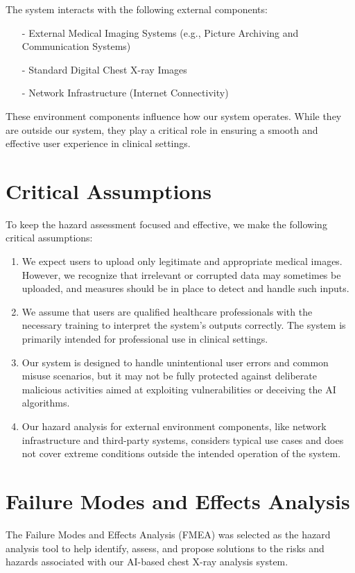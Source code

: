 \documentclass{article}
\begin{document}
The system interacts with the following external components:

\begin{itemize}
    \item[-] External Medical Imaging Systems (e.g., Picture Archiving and Communication Systems)
    \item[-] Standard Digital Chest X-ray Images
    \item[-] Network Infrastructure (Internet Connectivity)
\end{itemize}
These environment components influence how our system operates. While they are outside our system, they play a critical role in ensuring a smooth and effective user experience in clinical settings.

\section{Critical Assumptions}

To keep the hazard assessment focused and effective, we make the following critical assumptions:

\begin{enumerate}
    \item {We expect users to upload only legitimate and appropriate medical images. However, we recognize that irrelevant or corrupted data may sometimes be uploaded, and measures should be in place to detect and handle such inputs.}

    \item {We assume that users are qualified healthcare professionals with the necessary training to interpret the system's outputs correctly. The system is primarily intended for professional use in clinical settings.}
    \item {Our system is designed to handle unintentional user errors and common misuse scenarios, but it may not be fully protected against deliberate malicious activities aimed at exploiting vulnerabilities or deceiving the AI algorithms.}
    \item {Our hazard analysis for external environment components, like network infrastructure and third-party systems, considers typical use cases and does not cover extreme conditions outside the intended operation of the system.}

\end{enumerate}

\section{Failure Modes and Effects Analysis}
The Failure Modes and Effects Analysis (FMEA) was selected as the hazard analysis tool to help identify, assess, and propose solutions to the risks and hazards associated with our AI-based chest X-ray analysis system.
\end{document}
